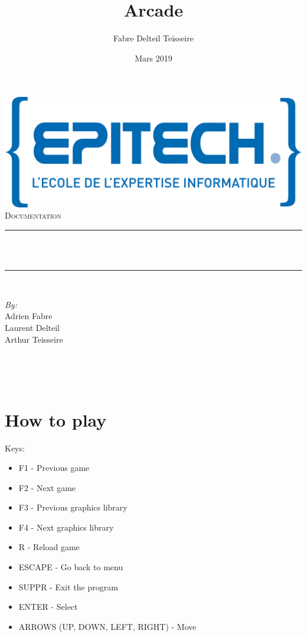 \documentclass[12pt]{article}
\title{Arcade}								%
\author{Fabre Delteil Teisseire}								%
\date{Mars 2019}											%
\makeatletter
\let\thetitle\@title
\makeatother
\begin{document}
\begin{titlepage}
	\centering
    \vspace*{0.5 cm}
    \includegraphics[scale = 0.75]{logo-epitech.png}\\[1.0 cm]	%
    \textsc{\LARGE Documentation}\\[2.0 cm]	%
	\rule{\linewidth}{0.2 mm} \\[0.4 cm]
	{ \huge \bfseries \thetitle}\\
	\rule{\linewidth}{0.2 mm} \\[1.5 cm]
	

\vspace{6cm}
	\begin{minipage}{0.7\textwidth}
		\begin{flushleft} \large
			\emph{By:}\\
			Adrien Fabre\\
            Laurent Delteil\\
            Arthur Teisseire\\
			\end{flushleft}
			\end{minipage}~
			\begin{minipage}{0.4\textwidth}
			\begin{flushright} \large

		\end{flushright}
        
	\end{minipage}\\[2 cm]
	
\end{titlepage}


\section{How to play} \label{HTP}
Keys:
\begin{itemize}
\item F1 - Previous game
\item F2 - Next game
\item F3 - Previous graphics library
\item F4 - Next graphics library
\item R - Reload game
\item ESCAPE - Go back to menu
\item SUPPR - Exit the program
\item ENTER - Select
\item ARROWS (UP, DOWN, LEFT, RIGHT) - Move
\end{itemize}
\end{document}
